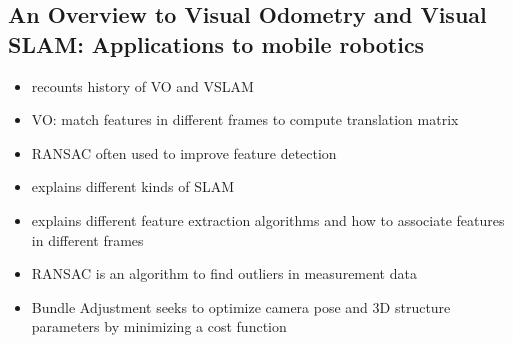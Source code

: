 \subsection{An Overview to Visual Odometry and Visual SLAM: Applications to mobile robotics}
\begin{itemize}
	\item recounts history of VO and VSLAM
	\item VO: match features in different frames to compute translation matrix
	\item RANSAC often used to improve feature detection
	\item explains different kinds of SLAM
	\item explains different feature extraction algorithms and how to associate features in different frames
	\item RANSAC is an algorithm to find outliers in measurement data
	\item Bundle Adjustment seeks to optimize camera pose and 3D structure parameters by minimizing a cost function
\end{itemize}

